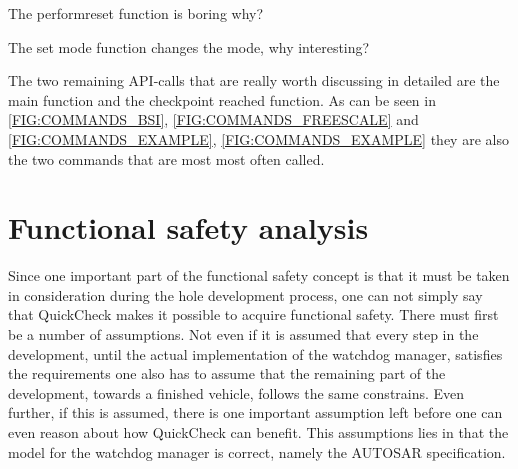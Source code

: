 The performreset function is boring why?

The set mode function changes the mode, why interesting?

The two remaining API-calls that are really worth discussing in detailed are the
main function and the checkpoint reached function. As can be seen in
\ref{FIG:COMMANDS_BSI}, \ref{FIG:COMMANDS_FREESCALE} and \ref{FIG:COMMANDS_EXAMPLE},
\ref{FIG:COMMANDS_EXAMPLE} they are also the two commands that are most most
often called.

\section{Functional safety analysis}
Since one important part of the functional safety concept is that it must be
taken in consideration during the hole development process, one can not simply
say that QuickCheck makes it possible to acquire functional safety. There must
first be a number of assumptions. Not even if it is assumed that
every step in the development, until the actual implementation of the watchdog
manager, satisfies the requirements one also has to assume that the remaining
part of the development, towards a finished vehicle, follows the same
constrains. Even further, if this is assumed, there is one important
assumption left before
one can even reason about how QuickCheck can benefit.
This assumptions lies in that the model for the watchdog
manager is correct, namely the AUTOSAR specification.
